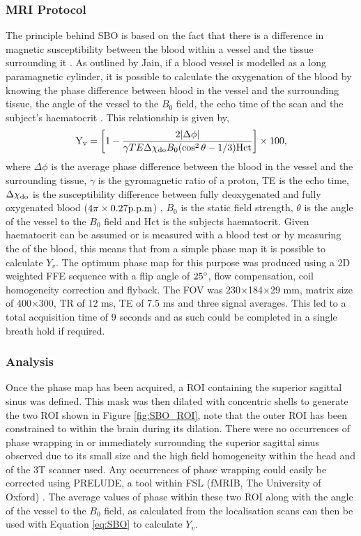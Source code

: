 \subsubsection{\ac{MRI} Protocol}
\label{sec:SBO_prot}
The principle behind \ac{SBO} is based on the fact that there is a difference in magnetic susceptibility between the blood within a vessel and the tissue surrounding it \cite{haacke_vivo_1997}. As outlined by Jain, if a blood vessel is modelled as a long paramagnetic cylinder, it is possible to calculate the oxygenation of the blood by knowing the phase difference between blood in the vessel and the surrounding tissue, the angle of the vessel to the $B_0$ field, the echo time of the scan and the subject's haematocrit \cite{jain_mri_2010}. This relationship is given by,
\begin{equation}
\textup{Y}_{\textup{v}} = \left[ 1-\frac{2|\Delta\phi|}{\gamma TE\Delta\chi_{\textup{do}}B_0(\cos^2\theta-1/3)\textup{Hct}}\right]\times 100,
\label{eq:SBO}
\end{equation}
where $\Delta\phi$ is the average phase difference between the blood in the vessel and the surrounding tissue, $\gamma$ is the gyromagnetic ratio of a proton, TE is the echo time, $\Delta\chi_{\textup{do}}$ is the susceptibility difference between fully deoxygenated and fully oxygenated blood ($4\pi\times0.27\textup{p.p.m}$) \cite{spees_water_2001, jain_investigating_2012}, $B_0$ is the static field strength, $\theta$ is the angle of the vessel to the $B_0$ field and Hct is the subjects haematocrit. Given haematocrit can be assumed or is measured with a blood test or by measuring the \tone of the blood, this means that from a simple phase map it is possible to calculate $Y_v$. The optimum phase map for this purpose was produced using a 2D \tone weighted \ac{FFE} sequence with a flip angle of $25\degree$, flow compensation, coil homogeneity correction and flyback. The \ac{FOV} was 230$\times$184$\times$29 mm, matrix size of 400$\times$300, \ac{TR} of 12 ms, \ac{TE} of 7.5 ms and three signal averages. This led to a total acquisition time of 9 seconds and as such could be completed in a single breath hold if required.

\subsubsection{Analysis}

Once the phase map has been acquired, a \ac{ROI} containing the superior sagittal sinus was defined. This mask was then dilated with concentric shells to generate the two \ac{ROI} shown in Figure \ref{fig:SBO_ROI}, note that the outer \ac{ROI} has been constrained to within the brain during its dilation. There were no occurrences of phase wrapping in or immediately surrounding the superior sagittal sinus observed due to its small size and the high field homogeneity within the head and of the 3T scanner used. Any occurrences of phase wrapping could easily be corrected using \ac{PRELUDE}, a tool within \ac{FSL} (fMRIB, The University of Oxford) \cite{jenkinson_fast_2003}. The average values of phase within these two \ac{ROI} along with the angle of the vessel to the $B_0$ field, as calculated from the localisation scans can then be used with Equation \eqref{eq:SBO} to calculate $Y_v$.

